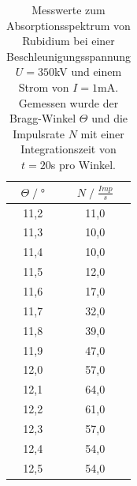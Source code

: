 \begin{table}[H]
    \centering
    \begin{tabular}{c c}
        \toprule
        $\Theta\;/\;°$& $N\;/\;\frac{Imp}{s}$\\
        \midrule
        11,2&    11,0\\
        11,3&    10,0\\
        11,4&    10,0\\
        11,5&    12,0\\
        11,6&    17,0\\
        11,7&    32,0\\
        11,8&    39,0\\
        11,9&    47,0\\
        12,0&    57,0\\
        12,1&    64,0\\
        12,2&    61,0\\
        12,3&    57,0\\
        12,4&    54,0\\
        12,5&    54,0\\
        \bottomrule
    \end{tabular}
    \caption{Messwerte zum Absorptionsspektrum von Rubidium bei einer Beschleunigungsspannung 
    $U=350$kV und einem Strom von $I=1$mA.\\
    Gemessen wurde der Bragg-Winkel $\Theta$ und die Impulsrate $N$ mit einer Integrationszeit
    von $t=20$s pro Winkel.}
\end{table}

\label{sec:anhang}